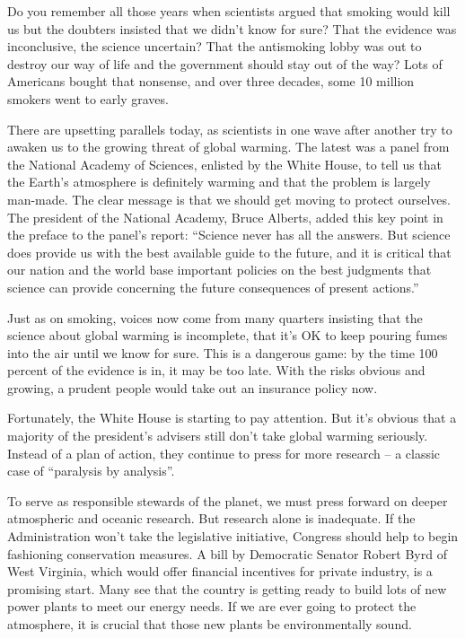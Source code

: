Do you remember all those years when scientists argued that smoking would kill us but the doubters insisted that we didn't know for sure? That the evidence was inconclusive, the science uncertain? That the antismoking lobby was out to destroy our way of life and the government should stay out of the way? Lots of Americans bought that nonsense, and over three decades, some 10 million smokers went to early graves.


There are upsetting parallels today, as scientists in one wave after another try to awaken us to the growing threat of global warming. The latest was a panel from the National Academy of Sciences, enlisted by the White House, to tell us that the Earth's atmosphere is definitely warming and that the problem is largely man-made. The clear message is that we should get moving to protect ourselves. The president of the National Academy, Bruce Alberts, added this key point in the preface to the panel's report: ``Science never has all the answers. But science does provide us with the best available guide to the future, and it is critical that our nation and the world base important policies on the best judgments that science can provide concerning the future consequences of present actions.''


Just as on smoking, voices now come from many quarters insisting that the science about global warming is incomplete, that it's OK to keep pouring fumes into the air until we know for sure. This is a dangerous game: by the time 100 percent of the evidence is in, it may be too late. With the risks obvious and growing, a prudent people would take out an insurance policy now.


Fortunately, the White House is starting to pay attention. But it's obvious that a majority of the president's advisers still don't take global warming seriously. Instead of a plan of action, they continue to press for more research – a classic case of ``paralysis by analysis''.


To serve as responsible stewards of the planet, we must press forward on deeper atmospheric and oceanic research. But research alone is inadequate. If the Administration won't take the legislative initiative, Congress should help to begin fashioning conservation measures. A bill by Democratic Senator Robert Byrd of West Virginia, which would offer financial incentives for private industry, is a promising start. Many see that the country is getting ready to build lots of new power plants to meet our energy needs. If we are ever going to protect the atmosphere, it is crucial that those new plants be environmentally sound.